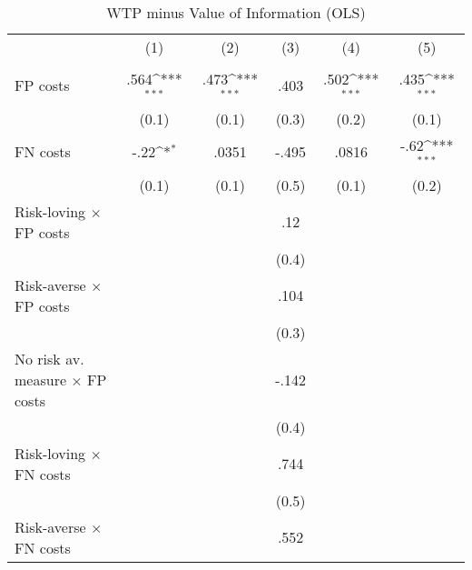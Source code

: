 \begin{table}[htbp]\centering
\def\sym#1{\ifmmode^{#1}\else\(^{#1}\)\fi}
\caption{WTP minus Value of Information (OLS)}
\begin{tabular}{l*{5}{c}}
\hline\hline
                &\multicolumn{1}{c}{(1)}&\multicolumn{1}{c}{(2)}&\multicolumn{1}{c}{(3)}&\multicolumn{1}{c}{(4)}&\multicolumn{1}{c}{(5)}\\
                &\multicolumn{1}{c}{}&\multicolumn{1}{c}{}&\multicolumn{1}{c}{}&\multicolumn{1}{c}{}&\multicolumn{1}{c}{}\\
\hline
FP costs        &     .564\sym{***}&     .473\sym{***}&     .403         &     .502\sym{***}&     .435\sym{***}\\
                &    (0.1)         &    (0.1)         &    (0.3)         &    (0.2)         &    (0.1)         \\
FN costs        &     -.22\sym{*}  &    .0351         &    -.495         &    .0816         &     -.62\sym{***}\\
                &    (0.1)         &    (0.1)         &    (0.5)         &    (0.1)         &    (0.2)         \\
Risk-loving $\times$ FP costs&                  &                  &      .12         &                  &                  \\
                &                  &                  &    (0.4)         &                  &                  \\
Risk-averse $\times$ FP costs&                  &                  &     .104         &                  &                  \\
                &                  &                  &    (0.3)         &                  &                  \\
No risk av. measure $\times$ FP costs&                  &                  &    -.142         &                  &                  \\
                &                  &                  &    (0.4)         &                  &                  \\
Risk-loving $\times$ FN costs&                  &                  &     .744         &                  &                  \\
                &                  &                  &    (0.5)         &                  &                  \\
Risk-averse $\times$ FN costs&                  &                  &     .552         &                  &                  \\

\end{tabular}
\end{table}
